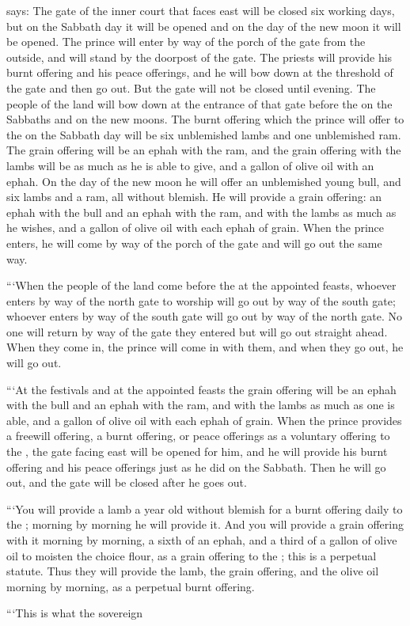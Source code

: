 {{}
says: The gate
of the inner
court
that faces
east
will be
closed
six
working
days,
but on the Sabbath
day
it will be opened
and on the day
of the new moon
it will be opened.
The prince
will enter
by way
of the porch
of the gate
from the outside,
and will stand
by the doorpost
of the gate.
The priests
will provide
his burnt offering
and his peace offerings,
and he will bow
down at the threshold
of the gate
and then go out.
But the gate
will not
be closed
until
evening.
The people
of the land
will bow
down at the entrance
of that gate
before
the {}
on the Sabbaths
and on the new moons.
The burnt offering
which
the prince
will offer
to the
{}
on the Sabbath
day
will be six
unblemished
lambs
and one unblemished
ram.
The grain offering
will be an ephah
with the ram,
and the grain offering
with the lambs
will be as much as he is able to give,
and a gallon
of olive oil
with an ephah.
On the day
of the new moon
he will offer an unblemished
young
bull,
and six
lambs
and a ram,
all without blemish.
He will provide
a grain offering: an ephah
with the bull
and an ephah
with the ram,
and with the lambs
as much as he wishes, and a gallon
of olive oil
with each ephah of grain.
When the prince
enters,
he will come
by way
of the porch
of the gate
and will go out
the same way.
\par }{\PP {}“‘When the people
of the land
come
before
the {}
at the appointed feasts,
whoever enters
by way
of the north
gate
to worship
will go out
by way
of the south
gate;
whoever enters
by way
of the south
gate
will go out
by way
of the north
gate.
No
one will return
by way
of the gate
they entered
but will go out
straight ahead.
When they come
in, the prince
will come
in with them, and when they go out,
he will go out.
\par }{\PP {}“‘At
the festivals
and at the appointed feasts
the grain offering
will be
an ephah
with the bull
and an ephah
with the ram,
and with the lambs
as much as one is able, and a gallon
of olive oil
with each ephah of grain.
When
the prince
provides a freewill
offering, a burnt offering,
or
peace offerings
as a voluntary
offering to the
{}, the
gate
facing
east
will be opened
for him, and he will provide
his burnt offering
and his peace offerings
just
as he did
on
the Sabbath.
Then he will go out,
and the
gate
will be closed
after
he goes out.
\par }{\PP {}“‘You will provide a lamb
a year
old without blemish
for a burnt offering
daily
to the
{}; morning
by morning
he will provide it.
And you will provide
a grain offering
with it morning
by morning,
a sixth
of an ephah,
and a third
of a gallon
of olive oil
to moisten
the choice flour,
as a grain offering
to the
{}; this is a perpetual
statute.
Thus they will provide
the lamb,
the grain offering,
and the olive oil
morning
by morning,
as a perpetual
burnt offering.
\par }{\PP {}“‘This is what
the sovereign

}

